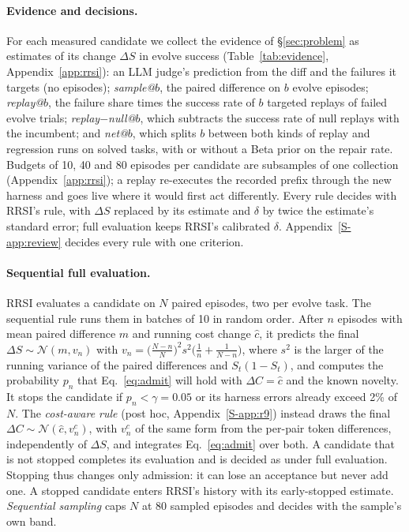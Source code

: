 \documentclass[11pt]{article}
\begin{document}
\paragraph{Evidence and decisions.} For each measured candidate we collect the evidence of \S\ref{sec:problem} as estimates of its change $\Delta S$ in evolve success (Table~\ref{tab:evidence}, Appendix~\ref{app:rrsi}): an LLM judge's prediction from the diff and the failures it targets (no episodes); \emph{sample@$b$}, the paired difference on $b$ evolve episodes; \emph{replay@$b$}, the failure share times the success rate of $b$ targeted replays of failed evolve trials; \emph{replay$-$null@$b$}, which subtracts the success rate of null replays with the incumbent; and \emph{net@$b$}, which splits $b$ between both kinds of replay and regression runs on solved tasks, with or without a Beta prior on the repair rate. Budgets of 10, 40 and 80 episodes per candidate are subsamples of one collection (Appendix~\ref{app:rrsi}); a replay re-executes the recorded prefix through the new harness and goes live where it would first act differently. Every rule decides with RRSI's rule, with $\Delta S$ replaced by its estimate and $\delta$ by twice the estimate's standard error; full evaluation keeps RRSI's calibrated $\delta$. Appendix~\ref*{S-app:review} decides every rule with one criterion.

\paragraph{Sequential full evaluation.} RRSI evaluates a candidate on $N$ paired episodes, two per evolve task. The sequential rule runs them in batches of 10 in random order. After $n$ episodes with mean paired difference $m$ and running cost change $\hat c$, it predicts the final $\Delta S\sim\mathcal N(m,v_n)$ with $v_n=\big(\frac{N-n}{N}\big)^2 s^2\big(\frac1n+\frac1{N-n}\big)$, where $s^2$ is the larger of the running variance of the paired differences and $S_t(1-S_t)$, and computes the probability $p_n$ that Eq.~\ref{eq:admit} will hold with $\Delta C=\hat c$ and the known novelty. It stops the candidate if $p_n<\gamma=0.05$ or its harness errors already exceed 2\% of $N$. The \emph{cost-aware rule} (post hoc, Appendix~\ref*{S-app:r9}) instead draws the final $\Delta C\sim\mathcal N(\hat c,v^c_n)$, with $v^c_n$ of the same form from the per-pair token differences, independently of $\Delta S$, and integrates Eq.~\ref{eq:admit} over both. A candidate that is not stopped completes its evaluation and is decided as under full evaluation. Stopping thus changes only admission: it can lose an acceptance but never add one. A stopped candidate enters RRSI's history with its early-stopped estimate. \emph{Sequential sampling} caps $N$ at 80 sampled episodes and decides with the sample's own band.
\end{document}
